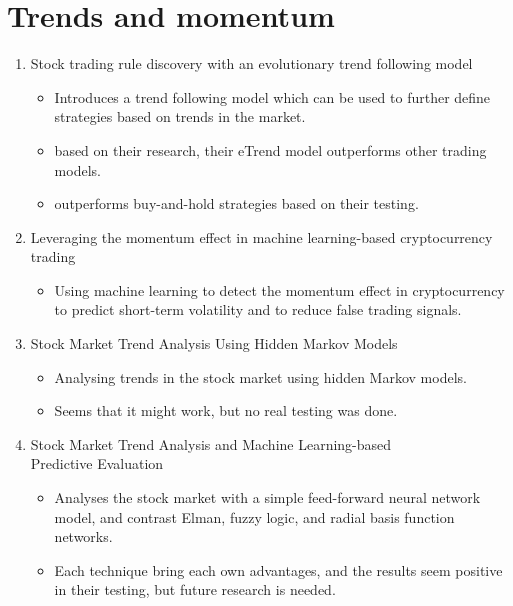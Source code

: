 \section{Trends and momentum}
    \begin{enumerate}
        \item Stock trading rule discovery with an evolutionary trend following model
        \cite{hu2015stock}
            \begin{itemize}
                \item Introduces a trend following model which can be used to further define strategies based on trends in the market.
                \item based on their research, their eTrend model outperforms other trading models.
                \item outperforms buy-and-hold strategies based on their testing.
            \end{itemize}

        \item Leveraging the momentum effect in machine learning-based cryptocurrency trading
        \cite{bellocca2022leveraging}
        \begin{itemize}
            \item Using machine learning to detect the momentum effect in cryptocurrency to predict short-term volatility and to reduce false trading signals.
        \end{itemize}

        \item Stock Market Trend Analysis Using Hidden Markov Models
        \cite{kavitha2013stock}
        \begin{itemize}
            \item Analysing trends in the stock market using hidden Markov models.
            \item Seems that it might work, but no real testing was done.
        \end{itemize}

        \item Stock Market Trend Analysis and Machine Learning-based\\
        Predictive Evaluation
        \cite{hurriyati2023stock}
        \begin{itemize}
            \item Analyses the stock market with a simple feed-forward neural network model, and contrast Elman, fuzzy logic, and radial basis function networks.
            \item Each technique bring each own advantages, and the results seem positive in their testing, but future research is needed.
        \end{itemize}


\end{enumerate}
